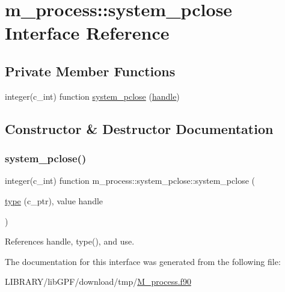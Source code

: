 \hypertarget{interfacem__process_1_1system__pclose}{}\section{m\+\_\+process\+:\+:system\+\_\+pclose Interface Reference}
\label{interfacem__process_1_1system__pclose}
\subsection*{Private Member Functions}
\begin{DoxyCompactItemize}
\item 
integer(c\+\_\+int) function \hyperlink{interfacem__process_1_1system__pclose_a8484cc191f8a18e155f97e284c3795ab}{system\+\_\+pclose} (\hyperlink{leave__watchgroup_83_8txt_ad6c5ebd26f707ef8da754021612a7c8d}{handle})
\end{DoxyCompactItemize}


\subsection{Constructor \& Destructor Documentation}
\mbox{\label{interfacem__process_1_1system__pclose_a8484cc191f8a18e155f97e284c3795ab}} 
\subsubsection{\texorpdfstring{system\+\_\+pclose()}{system\_pclose()}}
{\footnotesize\ttfamily integer(c\+\_\+int) function m\+\_\+process\+::system\+\_\+pclose\+::system\+\_\+pclose (\begin{DoxyParamCaption}\item[{\hyperlink{stop__watch_83_8txt_a70f0ead91c32e25323c03265aa302c1c}{type} (c\+\_\+ptr), value}]{handle }\end{DoxyParamCaption})\hspace{0.3cm}{\ttfamily [private]}}



References handle, type(), and use.



The documentation for this interface was generated from the following file\+:\begin{DoxyCompactItemize}
\item 
L\+I\+B\+R\+A\+R\+Y/lib\+G\+P\+F/download/tmp/\hyperlink{M__process_8f90}{M\+\_\+process.\+f90}\end{DoxyCompactItemize}
